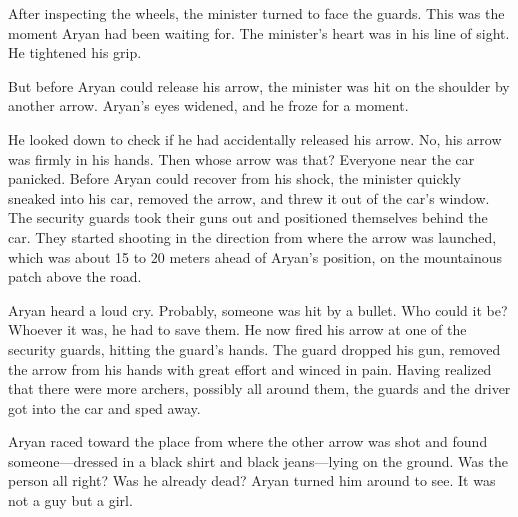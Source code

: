 After inspecting the wheels, the minister turned to face the guards. This was
the moment Aryan had been waiting for. The minister's heart was in his line of
sight.  He tightened his grip.

But before Aryan could release his arrow, the minister was hit on the shoulder
by another arrow. Aryan's eyes widened, and he froze for a moment.

He looked down to check if he had accidentally released his arrow. No, his arrow
was firmly in his hands. Then whose arrow was that? Everyone near the car
panicked. Before Aryan could recover from his shock, the minister quickly
sneaked into his car, removed the arrow, and threw it out of the car's window.
The security guards took their guns out and positioned themselves behind the
car. They started shooting in the direction from where the arrow was launched,
which was about 15 to 20 meters ahead of Aryan's position, on the mountainous
patch above the road.

Aryan heard a loud cry. Probably, someone was hit by a bullet. Who could it be?
Whoever it was, he had to save them. He now fired his arrow at one of the
security guards, hitting the guard's hands. The guard dropped his gun, removed
the arrow from his hands with great effort and winced in pain. Having realized
that there were more archers, possibly all around them, the guards and the
driver got into the car and sped away.

Aryan raced toward the place from where the other arrow was shot and found
someone—dressed in a black shirt and black jeans—lying on the ground. Was
the person all right? Was he already dead? Aryan turned him around to see. It
was not a guy but a girl.
